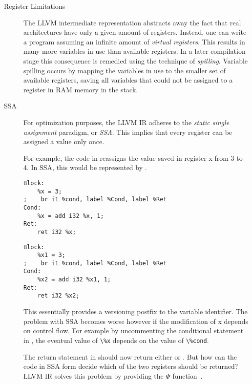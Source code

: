 \begin{description}
\item[Register Limitations]  The LLVM intermediate representation abstracts away the fact that real architectures have only a given amount of registers.
Instead, one can write a program assuming an infinite amount of \emph{virtual registers}.
This results in many more variables in use than available registers.
In a later compilation stage this consequence is remedied using the technique of \emph{spilling}.
Variable spilling occurs by mapping the variables in use to the smaller set of available registers, saving all variables that could not be assigned to a register in RAM memory in the stack.

\item[SSA] For optimization purposes, the LLVM IR adheres to the \emph{static single assignment} paradigm, or \emph{SSA}.
This implies that every register can be assigned a value only once.

For example, the code in  reassigns the value saved in register x from 3 to  4. In SSA, this would be represented by .
\begin{lstlisting}[label=lst:reassign, caption={[Variable Reassignment]Reassigning a variable.}, frame=single, language={[x86masm]Assembler}]
Block:
    %x = 3;
;    br i1 %cond, label %Cond, label %Ret
Cond:
    %x = add i32 %x, 1;
Ret:
    ret i32 %x;
\end{lstlisting}

\begin{lstlisting}[label=lst:ssa, caption={[SSA Representation 1]Code in SSA form.}, frame=single, language={[x86masm]Assembler}]
Block:
    %x1 = 3;
;    br i1 %cond, label %Cond, label %Ret
Cond:
    %x2 = add i32 %x1, 1;
Ret:
    ret i32 %x2;
\end{lstlisting}
This essentially provides a versioning postfix to the variable identifier. 
The problem with SSA becomes worse however if the modification of x depends on control flow. For example by uncommenting the conditional statement in , the eventual value of \lstinline[language={[x86masm]Assembler}]{\%x} depends on the value of \lstinline[language={[x86masm]Assembler}]{\%cond}.

The return statement in  should now return either  or .
But how can the code in SSA form decide which of the two registers should be returned?
LLVM IR solves this problem by providing the $\Phi$ function~\cite{Appel}.


\end{description}
